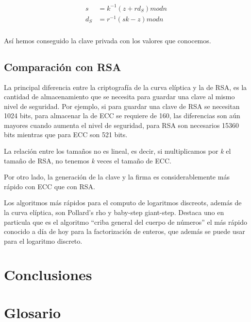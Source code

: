 \documentclass[11pt]{article}
\begin{document}
\begin{align}
\begin{split}
\textit{s} &= \textit{$k^{-1}$}(\textit{z} + \textit{r$d_S$}) mod \textit{n}\\
\textit{$d_S$} &= \textit{$r^{-1}$}(\textit{sk} - \textit{z}) mod \textit{n}\\
\end{split}
\end{align}

Así hemos conseguido la clave privada con los valores que conocemos.

\subsection{Comparación con RSA}

La principal diferencia entre la criptografía de la curva elíptica y la de RSA, es la cantidad de almacenamiento que se necesita para guardar una clave al mismo nivel de seguridad. Por ejemplo, si para guardar una clave de RSA se necesitan 1024 bits, para almacenar la de ECC se requiere de 160, las diferencias son aún mayores cuando aumenta el nivel de seguridad, para RSA son necesarios 15360 bits mientras que para ECC son 521 bits.

La relación entre los tamaños no es lineal, es decir, si multiplicamos por \textit{k} el tamaño de RSA, no tenemos \textit{k} veces el tamaño de ECC.

Por otro lado, la generación de la clave y la firma es considerablemente más rápido con ECC que con RSA.


Los algoritmos más rápidos para el computo de logaritmos discreots, además de la curva elíptica, son Pollard's rho y baby-step giant-step. Destaca uno en particula que es el algoritmo ``criba general del cuerpo de números'' el más rápido conocido a día de hoy para la factorización de enteros, que además se puede usar para el logaritmo discreto.


\section{Conclusiones}




\appendix
\renewcommand{\thesection}{\Roman{section}}
\setcounter{section}{0}
\section{Glosario}
\end{document}
